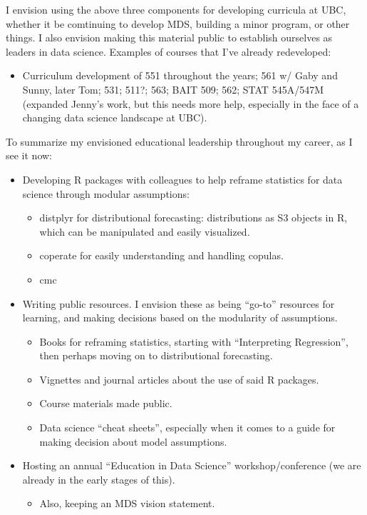 \documentclass[]{article}
\providecommand{\tightlist}{%
  \setlength{\itemsep}{0pt}\setlength{\parskip}{0pt}}
\begin{document}
I envision using the above three components for developing curricula at UBC, whether it be comtinuing to develop MDS, building a minor program, or other things. I also envision making this material public to establish ourselves as leaders in data science. Examples of courses that I've already redeveloped:

\begin{itemize}
\tightlist
\item
  Curriculum development of 551 throughout the years; 561 w/ Gaby and Sunny, later Tom; 531; 511?; 563; BAIT 509; 562; STAT 545A/547M (expanded Jenny's work, but this needs more help, especially in the face of a changing data science landscape at UBC).
\end{itemize}

To summarize my envisioned educational leadership throughout my career, as I see it now:

\begin{itemize}
\tightlist
\item
  Developing R packages with colleagues to help reframe statistics for data science through modular assumptions:

  \begin{itemize}
  \tightlist
  \item
    distplyr for distributional forecasting: distributions as S3 objects in R, which can be manipulated and easily visualized.
  \item
    coperate for easily understanding and handling copulas.
  \item
    cmc
  \end{itemize}
\item
  Writing public resources. I envision these as being ``go-to'' resources for learning, and making decisions based on the modularity of assumptions.

  \begin{itemize}
  \tightlist
  \item
    Books for reframing statistics, starting with ``Interpreting Regression'', then perhaps moving on to distributional forecasting.
  \item
    Vignettes and journal articles about the use of said R packages.
  \item
    Course materials made public.
  \item
    Data science ``cheat sheets'', especially when it comes to a guide for making decision about model assumptions.
  \end{itemize}
\item
  Hosting an annual ``Education in Data Science'' workshop/conference (we are already in the early stages of this).

  \begin{itemize}
  \tightlist
  \item
    Also, keeping an MDS vision statement.
  \end{itemize}
\end{itemize}
\end{document}

